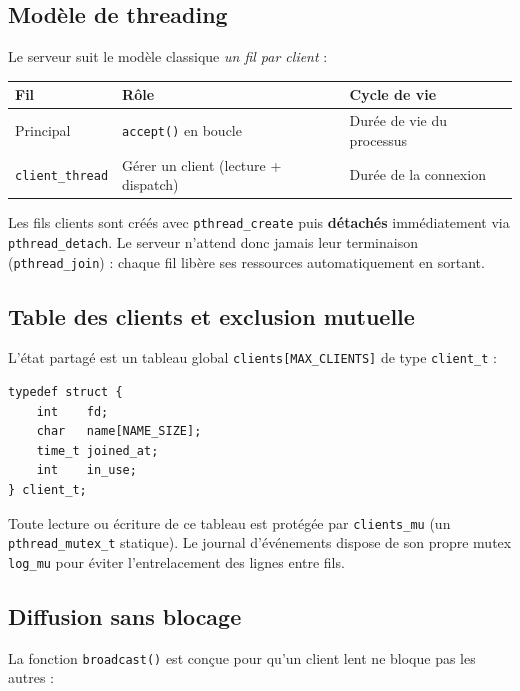 \documentclass[12pt,a4paper]{article}
\begin{document}
\subsection{Modèle de threading}

Le serveur suit le modèle classique \emph{un fil par client} :

\begin{center}
\begin{tabular}{@{}lll@{}}
\toprule
Fil & Rôle & Cycle de vie \\
\midrule
Principal & \texttt{accept()} en boucle & Durée de vie du processus \\
\texttt{client\_thread} & Gérer un client (lecture + dispatch) & Durée de la connexion \\
\bottomrule
\end{tabular}
\end{center}

Les fils clients sont créés avec \texttt{pthread\_create} puis
\textbf{détachés} immédiatement via \texttt{pthread\_detach}. Le serveur
n'attend donc jamais leur terminaison (\texttt{pthread\_join}) : chaque fil
libère ses ressources automatiquement en sortant.

\subsection{Table des clients et exclusion mutuelle}

L'état partagé est un tableau global \texttt{clients[MAX\_CLIENTS]} de type
\texttt{client\_t} :

\begin{lstlisting}[caption={Structure d'un client enregistré}]
typedef struct {
    int    fd;
    char   name[NAME_SIZE];
    time_t joined_at;
    int    in_use;
} client_t;
\end{lstlisting}

Toute lecture ou écriture de ce tableau est protégée par
\texttt{clients\_mu} (un \texttt{pthread\_mutex\_t} statique). Le journal
d'événements dispose de son propre mutex \texttt{log\_mu} pour éviter
l'entrelacement des lignes entre fils.

\subsection{Diffusion sans blocage}

La fonction \texttt{broadcast()} est conçue pour qu'un client lent ne bloque
pas les autres :
\end{document}
